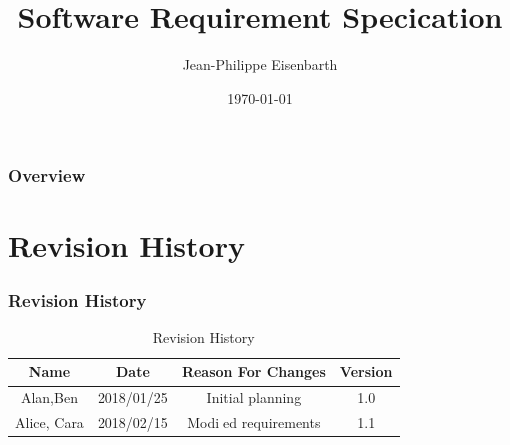\documentclass{beamer}
\title[Short title]{Software Requirement Specication } %
\author{Jean-Philippe Eisenbarth} %
\institute[UCLA] %
{
University of California \\ %
\medskip
\textit{jp@eisenbarth.io} %
}
\date{\today} %
\begin{document}
\begin{frame}
\titlepage %
\end{frame}

\begin{frame}
\frametitle{Overview} %
\tableofcontents %
\end{frame}


\section{Revision History} %



\begin{frame}
\frametitle{Revision History}

\begin{center}
\begin{table}
    \begin{tabular}{|c|c|c|c|}  	
      \hline
	    Name & Date & Reason For Changes & Version\\
        \hline
	    Alan,Ben& 2018/01/25 & Initial planning & 1.0\\
        \hline
	   Alice, Cara& 2018/02/15 &Modied requirements & 1.1\\
        \hline
   \end{tabular}
   \caption{Revision History}
\end{table}
\end{center}
\end{frame}
\end{document}
